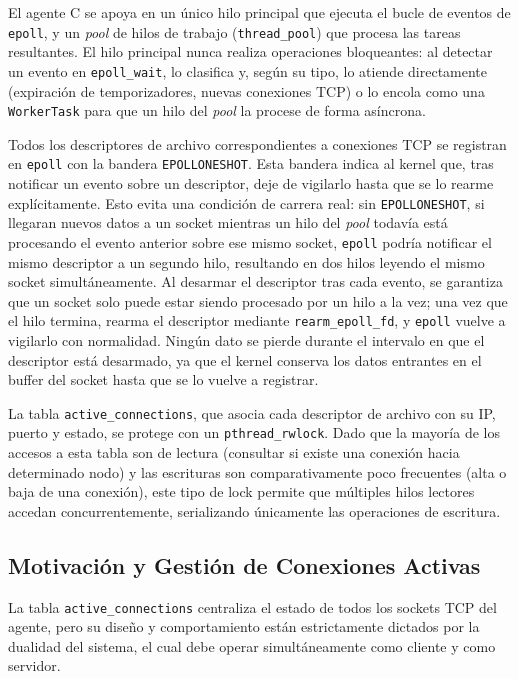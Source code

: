 \documentclass[12pt,a4paper]{article}
\begin{document}
El agente C se apoya en un único hilo principal que ejecuta el bucle de eventos de \texttt{epoll}, y un \emph{pool} de hilos de trabajo (\texttt{thread\_pool}) que procesa las tareas resultantes. El hilo principal nunca realiza operaciones bloqueantes: al detectar un evento en \texttt{epoll\_wait}, lo clasifica y, según su tipo, lo atiende directamente (expiración de temporizadores, nuevas conexiones TCP) o lo encola como una \texttt{WorkerTask} para que un hilo del \emph{pool} la procese de forma asíncrona.

Todos los descriptores de archivo correspondientes a conexiones TCP se registran en \texttt{epoll} con la bandera \texttt{EPOLLONESHOT}. Esta bandera indica al kernel que, tras notificar un evento sobre un descriptor, deje de vigilarlo hasta que se lo rearme explícitamente. Esto evita una condición de carrera real: sin \texttt{EPOLLONESHOT}, si llegaran nuevos datos a un socket mientras un hilo del \emph{pool} todavía está procesando el evento anterior sobre ese mismo socket, \texttt{epoll} podría notificar el mismo descriptor a un segundo hilo, resultando en dos hilos leyendo el mismo socket simultáneamente. Al desarmar el descriptor tras cada evento, se garantiza que un socket solo puede estar siendo procesado por un hilo a la vez; una vez que el hilo termina, rearma el descriptor mediante \texttt{rearm\_epoll\_fd}, y \texttt{epoll} vuelve a vigilarlo con normalidad. Ningún dato se pierde durante el intervalo en que el descriptor está desarmado, ya que el kernel conserva los datos entrantes en el buffer del socket hasta que se lo vuelve a registrar.

La tabla \texttt{active\_connections}, que asocia cada descriptor de archivo con su IP, puerto y estado, se protege con un \texttt{pthread\_rwlock}. Dado que la mayoría de los accesos a esta tabla son de lectura (consultar si existe una conexión hacia determinado nodo) y las escrituras son comparativamente poco frecuentes (alta o baja de una conexión), este tipo de lock permite que múltiples hilos lectores accedan concurrentemente, serializando únicamente las operaciones de escritura.

\subsection{Motivación y Gestión de Conexiones Activas}

La tabla \texttt{active\_connections} centraliza el estado de todos los sockets TCP del agente, pero su diseño y comportamiento están estrictamente dictados por la dualidad del sistema, el cual debe operar simultáneamente como cliente y como servidor. 
\end{document}
